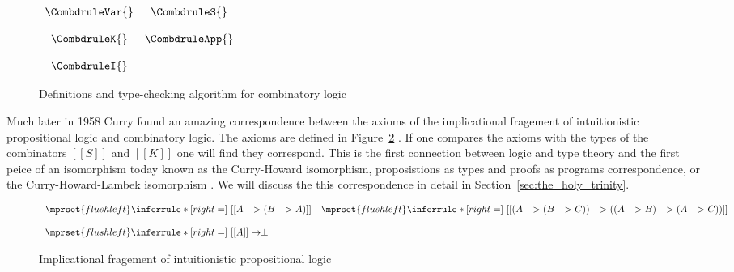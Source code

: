 \begin{figure}
  \begin{center}
    \begin{math}
      \begin{array}{ccc}
        \CombdruleVar{} & \CombdruleS{}\\
        & \\
        \CombdruleK{}   & \CombdruleApp{}\\ 
        & \\
        \CombdruleI{}
      \end{array}
    \end{math}
  \end{center}

  \caption{Definitions and type-checking algorithm for combinatory logic}
  \label{fig:comb_typing}
\end{figure}

Much later in 1958 Curry found an amazing correspondence between the
axioms of the implicational fragement of intuitionistic propositional
logic and combinatory logic.  The axioms are defined in
Figure~\ref{fig:hilbert_system} \cite{Troelstra:2000}.  If one
compares the axioms with the types of the combinators $[[S]]$ and
$[[K]]$ one will find they correspond.  This is the first connection
between logic and type theory and the first peice of an isomorphism
today known as the Curry-Howard isomorphism, proposistions as types
and proofs as programs correspondence, or the Curry-Howard-Lambek
isomorphism \cite{Howard:1980}.  We will discuss the this
correspondence in detail in Section~\ref{sec:the_holy_trinity}.

\begin{figure}
  \begin{center}
    \begin{math}
      \begin{array}{lll}
        $$\mprset{flushleft}
        \inferrule* [right=] {
          \ 
        }{[[A -> (B -> A)]]}
        &
        $$\mprset{flushleft}
        \inferrule* [right=] {
          \ 
        }{[[(A -> (B -> C)) -> ((A -> B) -> (A ->C))]]}\\
        & \\
        $$\mprset{flushleft}
        \inferrule* [right=] {
         \  
        }{[[A]] \to \perp}
      \end{array}
    \end{math}
  \end{center}
  \caption{Implicational fragement of intuitionistic propositional logic}
  \label{fig:hilbert_system}
\end{figure}

